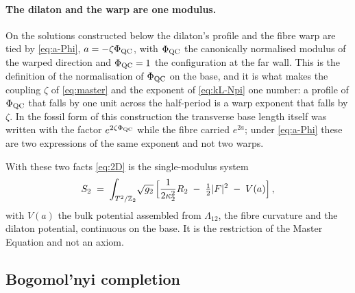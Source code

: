 \paragraph{The dilaton and the warp are one modulus.}
On the solutions constructed below the dilaton's profile and the fibre
warp are tied by \eqref{eq:a-Phi}, $a=-\zeta\Phi_{\mathrm{QC}}$, with $\Phi_{\mathrm{QC}}$ the
canonically normalised modulus of the warped direction and $\Phi_{\mathrm{QC}}=1$ the
configuration at the far wall. This is the definition of the
normalisation of $\Phi_{\mathrm{QC}}$ on the base, and it is what makes the coupling
$\zeta$ of \eqref{eq:master} and the exponent of \eqref{eq:kL-Npi} one
number: a profile of $\Phi_{\mathrm{QC}}$ that falls by one unit across the half-period
is a warp exponent that falls by $\zeta$. In the fossil form of this
construction the transverse base length itself was written with the
factor $e^{2\zeta\Phi_{\mathrm{QC}}}$ while the fibre carried $e^{2a}$; under
\eqref{eq:a-Phi} these are two expressions of the same exponent and not
two warps. \rigD

With these two facts \eqref{eq:2D} is the single-modulus system
\begin{equation}\label{eq:2D-single}
  S_{2}\;=\;\int_{T^2/\mathbb{Z}_2}\!\sqrt{g_{2}}\,
  \Bigl[\frac{1}{2\kappa_{2}^{2}}R_{2}\;-\;\tfrac12\lvert F\rvert^{2}\;-\;V(a)\Bigr]\,,
\end{equation}
with $V(a)$ the bulk potential assembled from $\Lambda_{12}$, the fibre
curvature and the dilaton potential, continuous on the base. It is the
restriction of the Master Equation and not an axiom. \rigD

\subsection{Bogomol'nyi completion}\label{sec:bps}

